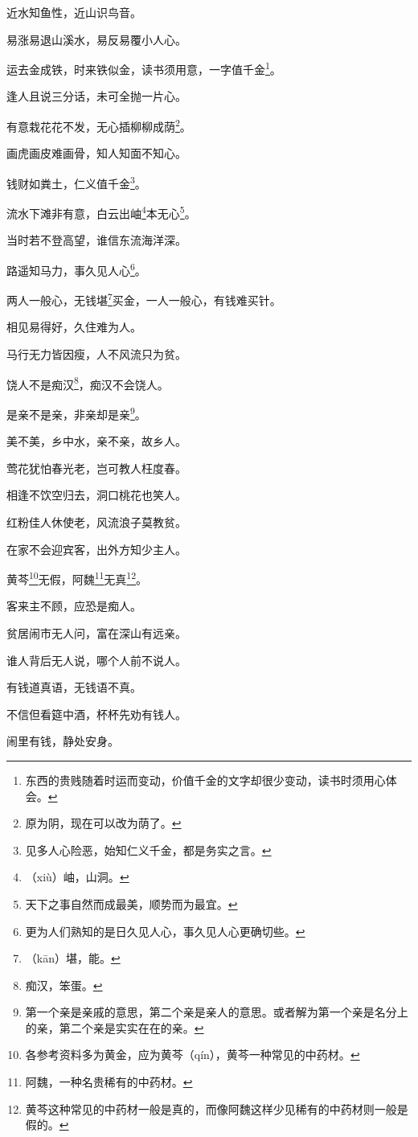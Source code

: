 \documentclass[12pt,oneside]{book}
\begin{document}
近水知鱼性，近山识鸟音。

易涨易退山溪水，易反易覆小人心。

运去金成铁，时来铁似金，读书须用意，一字值千金\footnote{东西的贵贱随着时运而变动，价值千金的文字却很少变动，读书时须用心体会。}。

逢人且说三分话，未可全抛一片心。

有意栽花花不发，无心插柳柳成荫\footnote{原为阴，现在可以改为荫了。}。

画虎画皮难画骨，知人知面不知心。

钱财如粪土，仁义值千金\footnote{见多人心险恶，始知仁义千金，都是务实之言。}。

流水下滩非有意，白云出岫\footnote{（xiù）岫，山洞。}本无心\footnote{天下之事自然而成最美，顺势而为最宜。}。

当时若不登高望，谁信东流海洋深。

路遥知马力，事久见人心\footnote{更为人们熟知的是日久见人心，事久见人心更确切些。}。

两人一般心，无钱堪\footnote{（kān）堪，能。}买金，一人一般心，有钱难买针。

相见易得好，久住难为人。

马行无力皆因瘦，人不风流只为贫。

饶人不是痴汉\footnote{痴汉，笨蛋。}，痴汉不会饶人。

是亲不是亲，非亲却是亲\footnote{第一个亲是亲戚的意思，第二个亲是亲人的意思。或者解为第一个亲是名分上的亲，第二个亲是实实在在的亲。}。

美不美，乡中水，亲不亲，故乡人。

莺花犹怕春光老，岂可教人枉度春。

相逢不饮空归去，洞口桃花也笑人。

红粉佳人休使老，风流浪子莫教贫。

在家不会迎宾客，出外方知少主人。

黄芩\footnote{各参考资料多为黄金，应为黄芩（qín），黄芩一种常见的中药材。}无假，阿魏\footnote{阿魏，一种名贵稀有的中药材。}无真\footnote{黄芩这种常见的中药材一般是真的，而像阿魏这样少见稀有的中药材则一般是假的。}。

客来主不顾，应恐是痴人。

贫居闹市无人问，富在深山有远亲。

谁人背后无人说，哪个人前不说人。

有钱道真语，无钱语不真。

不信但看筵中酒，杯杯先劝有钱人。

闹里有钱，静处安身。
\end{document}
